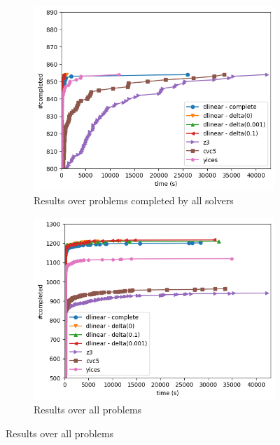 \documentclass[runningheads]{llncs}
\begin{document}
\begin{figure}[H]
    \centering
    \begin{subfigure}{.46\textwidth}
        \centering
        \includegraphics[width=\linewidth]{img/on_file_lp.png}
        \caption{Results over problems completed by all solvers}
        \label{fig:results-lp1}
    \end{subfigure}%
    \hspace{1cm}
    \begin{subfigure}{.45\textwidth}
        \centering
        \includegraphics[width=\linewidth]{img/total_lp.png}
        \caption{Results over all problems}
        \label{fig:results-lp2}
    \end{subfigure}
\end{figure}
\end{document}
